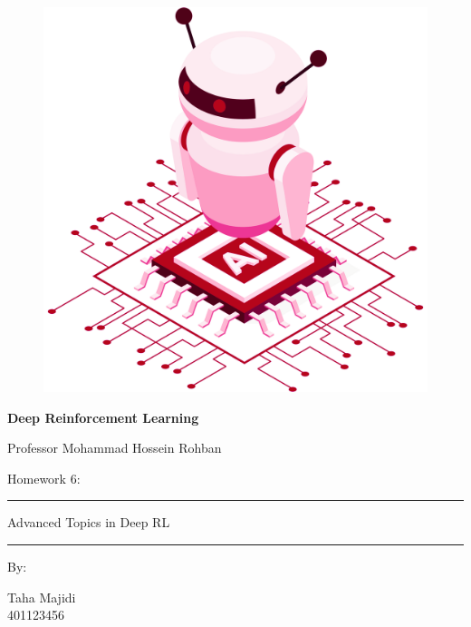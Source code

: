 \documentclass[12pt]{article}
\begin{document}
\thispagestyle{plain}

\begin{center}

\vspace*{-1.5cm}
\begin{figure}[!h]
    \centering
    \includegraphics[width=0.7\linewidth]{figs/cover-std.png}
\end{figure}

{

{\color{DarkBlue} {\fontsize{30}{50} \textbf{
Deep Reinforcement Learning
}}}

{\color{DarkBlue} {\Large
Professor Mohammad Hossein Rohban
}}
}


\vspace{20pt}

{


{\color{RedOrange}
{\Large
Homework 6:
}\\
}
{\color{BrickRed}
\rule{12cm}{0.5pt}

{\Huge
Advanced Topics in Deep RL
}
\rule{12cm}{0.5pt}
}

\vspace{10pt}

{\color{RoyalPurple} { \small By:} } \\
\vspace{10pt}

{\color{Blue} { \LARGE Taha Majidi } } \\
\vspace{5pt}
{\color{RoyalBlue} { \Large 401123456 } }


}
\end{center}
\end{document}
